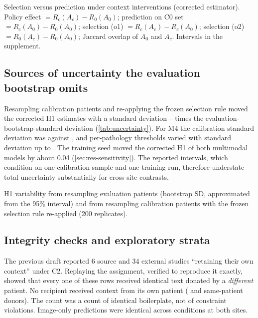 \begin{table}[t]
\centering\scriptsize
\caption{Selection versus prediction under context interventions (corrected
estimator). Policy effect $=R_c(A_c)-R_0(A_0)$; prediction on C0 set
$=R_c(A_0)-R_0(A_0)$; selection (o1) $=R_c(A_c)-R_c(A_0)$; selection (o2)
$=R_0(A_c)-R_0(A_0)$; Jaccard overlap of $A_0$ and $A_c$. Intervals in the
supplement.}
\label{tab:context}
\begin{adjustbox}{max width=\linewidth}

\end{adjustbox}
\end{table}

\subsection{Sources of uncertainty the evaluation bootstrap omits}
\label{sec:res-uncertainty}
Resampling calibration patients and re-applying the frozen selection rule moved
the corrected H1 estimates with a standard deviation \CalRatioMin{}--\CalRatioMax{}
times the evaluation-bootstrap standard deviation (\cref{tab:uncertainty}). For
M4 the calibration standard deviation was \CalSDMFour{} against \EvalSDMFour{}, and
per-pathology thresholds varied with standard deviation up to \ThrSDMaxMFour{}.
The training seed moved the corrected H1 of both multimodal models by about
0.04 (\cref{sec:res-sensitivity}). The reported intervals, which condition on
one calibration sample and one training run, therefore understate total
uncertainty substantially for cross-site contrasts.

\begin{table}[t]
\centering\scriptsize
\caption{H1 variability from resampling evaluation patients (bootstrap SD,
approximated from the 95\% interval) and from resampling calibration patients
with the frozen selection rule re-applied (200 replicates).}
\label{tab:uncertainty}
\begin{adjustbox}{max width=\linewidth}

\end{adjustbox}
\end{table}

\subsection{Integrity checks and exploratory strata}
\label{sec:res-c2}
The previous draft reported 6 source and 34 external studies ``retaining their
own context'' under C2. Replaying the assignment, verified to reproduce it
exactly, showed that every one of these rows received identical text donated by
a \emph{different} patient. No recipient received context from its own patient
(\CTwoSamePatSrc{} and \CTwoSamePatExt{} same-patient donors). The count was a
count of identical boilerplate, not of constraint violations. Image-only
predictions were identical across conditions at both sites.

